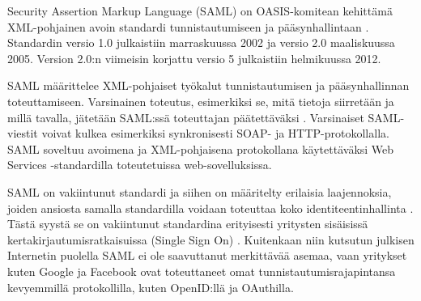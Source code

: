Security Assertion Markup Language (SAML) on OASIS-komitean kehittämä XML-pohjainen avoin standardi tunnistautumiseen ja pääsynhallintaan \cite{saml_spec}. Standardin versio 1.0 julkaistiin marraskuussa 2002 ja versio 2.0 maaliskuussa 2005. Version 2.0:n viimeisin korjattu versio 5 julkaistiin helmikuussa 2012.

SAML määrittelee XML-pohjaiset työkalut tunnistautumisen ja pääsynhallinnan toteuttamiseen. Varsinainen toteutus, esimerkiksi se, mitä tietoja siirretään ja millä tavalla, jätetään SAML:ssä toteuttajan päätettäväksi \cite{dynamic_saml}. Varsinaiset SAML-viestit voivat kulkea esimerkiksi synkronisesti SOAP- ja HTTP-protokollalla. SAML soveltuu avoimena ja XML-pohjaisena protokollana käytettäväksi Web Services -standardilla toteutetuissa web-sovelluksissa.

SAML on vakiintunut standardi ja siihen on määritelty erilaisia laajennoksia, joiden ansiosta samalla standardilla voidaan toteuttaa koko identiteentinhallinta \cite{saml_spec}. Tästä syystä se on vakiintunut standardina erityisesti yritysten sisäisissä kertakirjautumisratkaisuissa (Single Sign On) \cite{dynamic_saml}. Kuitenkaan niin kutsutun julkisen Internetin puolella SAML ei ole saavuttanut merkittävää asemaa, vaan yritykset kuten Google ja Facebook ovat toteuttaneet omat tunnistautumisrajapintansa kevyemmillä protokollilla, kuten OpenID:llä ja OAuthilla.